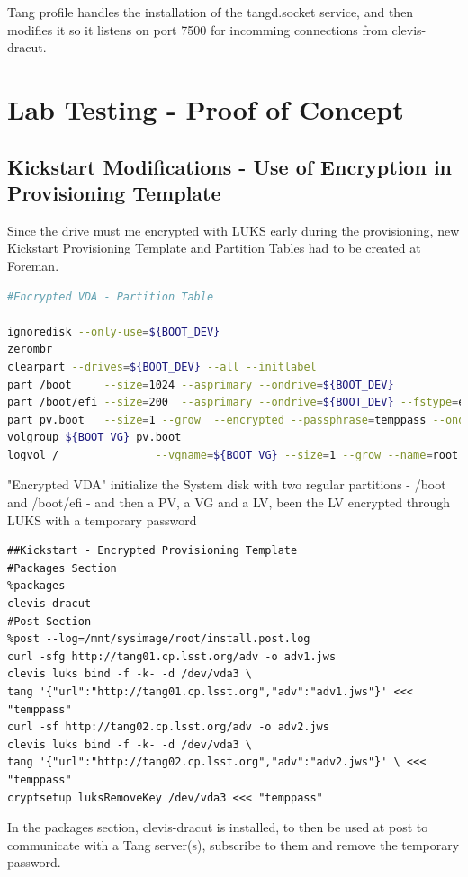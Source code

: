Tang profile handles the installation of the tangd.socket service, and then modifies it so it listens on port 7500 for incomming connections from clevis-dracut.

\newpage
\section{Lab Testing - Proof of Concept}
\subsection{Kickstart Modifications - Use of Encryption in Provisioning Template}
Since the drive must me encrypted with LUKS early during the provisioning, new Kickstart Provisioning Template and Partition Tables had to be created at Foreman.

\vskip 0.5cm
\begin{lstlisting}[language=bash]
#Encrypted VDA - Partition Table

ignoredisk --only-use=${BOOT_DEV}
zerombr
clearpart --drives=${BOOT_DEV} --all --initlabel
part /boot     --size=1024 --asprimary --ondrive=${BOOT_DEV}
part /boot/efi --size=200  --asprimary --ondrive=${BOOT_DEV} --fstype=efi
part pv.boot   --size=1 --grow  --encrypted --passphrase=temppass --ondisk=${BOOT_DEV}
volgroup ${BOOT_VG} pv.boot
logvol /               --vgname=${BOOT_VG} --size=1 --grow --name=root
\end{lstlisting}

"Encrypted VDA" initialize the System disk with two regular partitions - /boot and /boot/efi - and then a PV, a VG and a LV, been the LV encrypted through LUKS with a temporary password
\begin{lstlisting}
##Kickstart - Encrypted Provisioning Template
#Packages Section
%packages
clevis-dracut
#Post Section
%post --log=/mnt/sysimage/root/install.post.log
curl -sfg http://tang01.cp.lsst.org/adv -o adv1.jws
clevis luks bind -f -k- -d /dev/vda3 \
tang '{"url":"http://tang01.cp.lsst.org","adv":"adv1.jws"}' <<< "temppass"
curl -sf http://tang02.cp.lsst.org/adv -o adv2.jws
clevis luks bind -f -k- -d /dev/vda3 \
tang '{"url":"http://tang02.cp.lsst.org","adv":"adv2.jws"}' \ <<< "temppass"
cryptsetup luksRemoveKey /dev/vda3 <<< "temppass"
\end{lstlisting}

In the packages section, clevis-dracut is installed, to then be used at post to communicate with a Tang server(s), subscribe to them and remove the temporary password.

